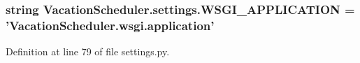 \hypertarget{namespaceVacationScheduler_1_1settings_ac8d4cd49d0a6b3d6dd2e7f8fa11e7cf1}{
\subsubsection[{W\-S\-G\-I\-\_\-\-A\-P\-P\-L\-I\-C\-A\-T\-I\-O\-N}]{\setlength{\rightskip}{0pt plus 5cm}string Vacation\-Scheduler.\-settings.\-W\-S\-G\-I\-\_\-\-A\-P\-P\-L\-I\-C\-A\-T\-I\-O\-N = '{\bf Vacation\-Scheduler.\-wsgi.\-application}'}}\label{namespaceVacationScheduler_1_1settings_ac8d4cd49d0a6b3d6dd2e7f8fa11e7cf1}


Definition at line 79 of file settings.\-py.

